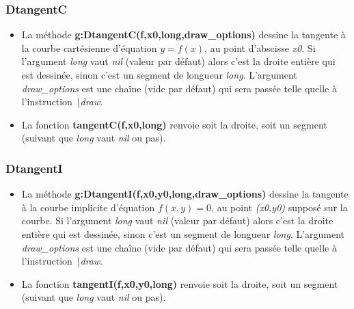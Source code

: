 \subsubsection{ DtangentC}
\begin{itemize}
    \item La méthode \textbf{g:DtangentC(f,x0,long,draw\_options)} dessine la tangente à la courbe cartésienne d'équation \(y=f(x)\), au point d'abscisse \emph{x0}. Si l'argument \emph{long} vaut \emph{nil} (valeur par défaut) alors c'est la droite entière qui est dessinée, sinon c'est un segment de longueur \emph{long}. L'argument \emph{draw\_options} est une chaîne (vide par défaut) qui sera passée telle quelle à l'instruction \emph{\textbackslash draw}.
    \item La fonction \textbf{tangentC(f,x0,long)} renvoie soit la droite, soit un segment (suivant que \emph{long} vaut \emph{nil} ou pas).
\end{itemize}

\subsubsection{ DtangentI}
\begin{itemize}
    \item La méthode \textbf{g:DtangentI(f,x0,y0,long,draw\_options)} dessine la tangente à la courbe implicite d'équation \(f(x,y)=0\), au point \emph{(x0,y0)} supposé sur la courbe. Si l'argument \emph{long} vaut \emph{nil} (valeur par défaut) alors c'est la droite entière qui est dessinée, sinon c'est un segment de longueur \emph{long}. L'argument \emph{draw\_options} est une chaîne (vide par défaut) qui sera passée telle quelle à l'instruction \emph{\textbackslash draw}.
    \item La fonction \textbf{tangentI(f,x0,y0,long)} renvoie soit la droite, soit un segment (suivant que \emph{long} vaut \emph{nil} ou pas).
\end{itemize}
  

